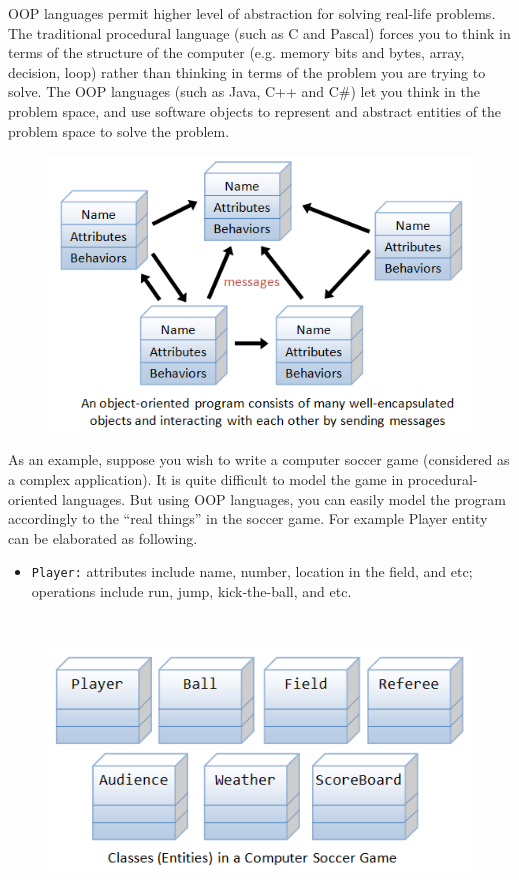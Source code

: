 \documentclass[11pt,a4paper]{article}
\begin{document}
OOP languages permit higher level of abstraction for solving real-life problems. The traditional procedural language (such as C and Pascal) forces you to think in terms of the structure of the computer (e.g. memory bits and bytes, array, decision, loop) rather than thinking in terms of the problem you are trying to solve. The OOP languages (such as Java, C++ and C\#) let you think in the problem space, and use software objects to represent and abstract entities of the problem space to solve the problem.

\begin{figure}[H]
\begin{center}
\includegraphics[scale=0.6]{OOP_Objects.png}
\end{center}
\end{figure}
As an example, suppose you wish to write a computer soccer game (considered as a complex application). It is quite difficult to model the game in procedural-oriented languages. But using OOP languages, you can easily model the program accordingly to the ``real things'' in the soccer game. For example Player entity can be elaborated as following.
\begin{itemize}
\item \texttt{Player:} attributes include name, number, location in the field, and etc; operations include run, jump, kick-the-ball, and etc.
\end{itemize}
\vfill{\ }
\begin{figure}[H]
\begin{center}
\includegraphics[scale=0.7]{OOP_SoccerGame.png}
\end{center}
\end{figure}
\end{document}
